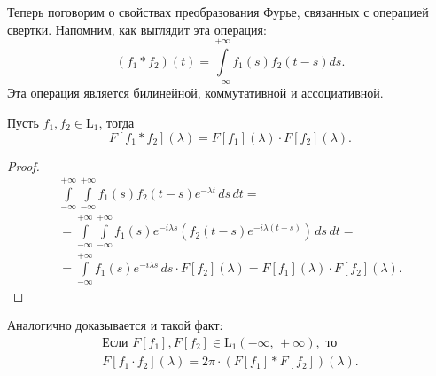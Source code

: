 Теперь поговорим о свойствах преобразования Фурье, связанных с операцией свертки. Напомним, как выглядит эта операция:
$$
        (f_1 * f_2)(t) = \int\limits_{-\infty}^{+\infty}f_1(s)f_2(t-s)ds.
$$
Эта операция является билинейной, коммутативной и ассоциативной.
\begin{theorem}
        Пусть $f_1, f_2 \in \mathrm{L}_1$, тогда
\begin{equation}
        F[f_1*f_2](\lambda) = F[f_1](\lambda) \cdot F[f_2](\lambda).
\end{equation}
\end{theorem}
\begin{proof}
        \begin{multline*}
\int\limits_{-\infty}^{+\infty}
\int\limits_{-\infty}^{+\infty}
f_1(s)f_2(t-s)e^{-\lambda t}\,ds\,dt
=\\=
\int\limits_{-\infty}^{+\infty}
\int\limits_{-\infty}^{+\infty}
f_1(s)e^{-i\lambda s}
\left(
f_2(t-s)e^{-i\lambda(t-s)}
\right)
\,ds\,dt
=\\=
\int\limits_{-\infty}^{+\infty}
f_1(s)e^{-i\lambda s}\,ds
\cdot F[f_2](\lambda)
=
F[f_1](\lambda)\cdot F[f_2](\lambda).
        \end{multline*}
\end{proof}
\begin{remark}
        Аналогично доказывается и такой факт:
\begin{equation}
\begin{split}
        \mbox{Если } F[f_1],F[f_2]\in\mathrm{L}_1(-\infty,\,+\infty), \mbox{ то}
\\
        F[f_1 \cdot f_2](\lambda)
=
        2\pi \cdot (F[f_1]*F[f_2])(\lambda). 
\end{split}
\end{equation}
\end{remark}